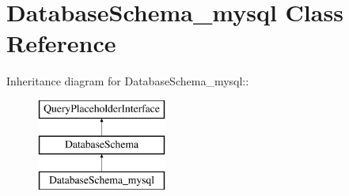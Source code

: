 \hypertarget{classDatabaseSchema__mysql}{
\section{DatabaseSchema\_\-mysql Class Reference}
\label{classDatabaseSchema__mysql}
}
Inheritance diagram for DatabaseSchema\_\-mysql::\begin{figure}[H]
\begin{center}
\leavevmode
\includegraphics[height=3cm]{classDatabaseSchema__mysql}
\end{center}
\end{figure}
